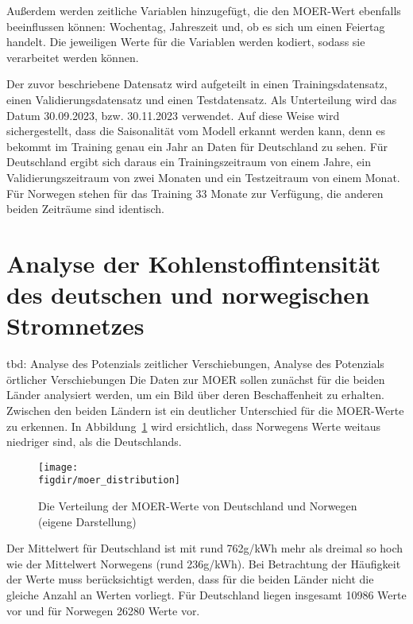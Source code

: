 Außerdem werden zeitliche Variablen hinzugefügt, die den MOER-Wert ebenfalls beeinflussen können: Wochentag, Jahreszeit und, ob es sich um einen Feiertag handelt.
Die jeweiligen Werte für die Variablen werden kodiert, sodass sie verarbeitet werden können.

Der zuvor beschriebene Datensatz wird aufgeteilt in einen Trainingsdatensatz, einen Validierungsdatensatz und einen Testdatensatz.
Als Unterteilung wird das Datum 30.09.2023, bzw. 30.11.2023 verwendet.
Auf diese Weise wird sichergestellt, dass die Saisonalität vom Modell erkannt werden kann, denn es bekommt im Training genau ein Jahr an Daten für Deutschland zu sehen.
Für Deutschland ergibt sich daraus ein Trainingszeitraum von einem Jahre, ein Validierungszeitraum von zwei Monaten und ein Testzeitraum von einem Monat.
Für Norwegen stehen für das Training 33 Monate zur Verfügung, die anderen beiden Zeiträume sind identisch.

\section{Analyse der Kohlenstoffintensität des deutschen und norwegischen Stromnetzes}
tbd: Analyse des Potenzials zeitlicher Verschiebungen, Analyse des Potenzials örtlicher Verschiebungen
Die Daten zur \ac{MOER} sollen zunächst für die beiden Länder analysiert werden, um ein Bild über deren Beschaffenheit zu erhalten.
Zwischen den beiden Ländern ist ein deutlicher Unterschied für die MOER-Werte zu erkennen.
In Abbildung~\ref{FIG:moer_distribution} wird ersichtlich, dass Norwegens Werte weitaus niedriger sind, als die Deutschlands.
\begin{figure}
 \caption{Die Verteilung der MOER-Werte von Deutschland und Norwegen (eigene Darstellung)}
 {\texttt{[image: \\figdir/moer\_distribution]}}
 \label{FIG:moer_distribution}
\end{figure}
Der Mittelwert für Deutschland ist mit rund 762g/kWh mehr als dreimal so hoch wie der Mittelwert Norwegens (rund 236g/kWh).
Bei Betrachtung der Häufigkeit der Werte muss berücksichtigt werden, dass für die beiden Länder nicht die gleiche Anzahl an Werten vorliegt.
Für Deutschland liegen insgesamt 10986 Werte vor und für Norwegen 26280 Werte vor.

